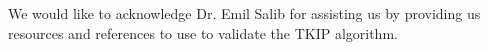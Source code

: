 \documentclass[main.tex]{subfiles}
\begin{document}
We would like to acknowledge Dr. Emil Salib for assisting us by providing us resources and references to use to validate the TKIP algorithm.
\end{document}
